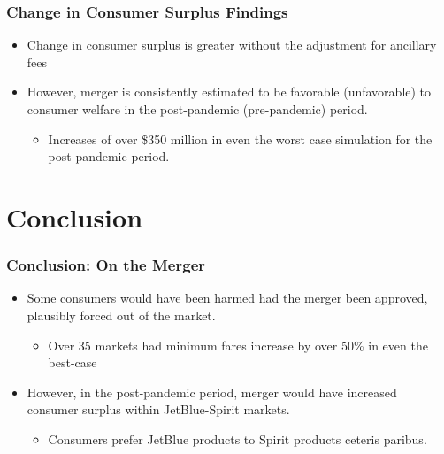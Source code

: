\documentclass[xcolor=dvipsnames]{beamer}
\begin{document}
    \begin{frame}
        \frametitle{Change in Consumer Surplus Findings}
        \begin{itemize}
            \item Change in consumer surplus is greater without the adjustment for ancillary fees
            \item However, merger is consistently estimated to be favorable (unfavorable) to consumer welfare in the post-pandemic (pre-pandemic) period.
            \begin{itemize}
                \item Increases of over \$350 million in even the worst case simulation for the post-pandemic period.
            \end{itemize}
        \end{itemize}
    \end{frame}

    
    \section{Conclusion}
    \begin{frame}
        \frametitle{Conclusion: On the Merger}
        \begin{itemize}
            \item Some consumers would have been harmed had the merger been approved, plausibly forced out of the market.
            \begin{itemize}
                \item Over 35 markets had minimum fares increase by over 50\% in even the best-case
            \end{itemize}
            \item However, in the post-pandemic period, merger would have increased consumer surplus within JetBlue-Spirit markets.
            \begin{itemize}
                \item Consumers prefer JetBlue products to Spirit products ceteris paribus.
            \end{itemize}
        \end{itemize}
    \end{frame} 
\end{document}
